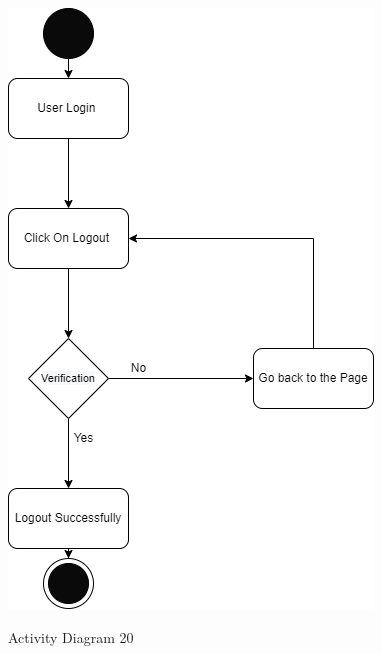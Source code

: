 \begin{figure}[H]
    \centering
    \caption{Activity Diagram 20}
    \includegraphics[scale=0.5]{./diagrams/Activity Diagram/ad-20.png}
    \label{fig:act-20}

\end{figure}
